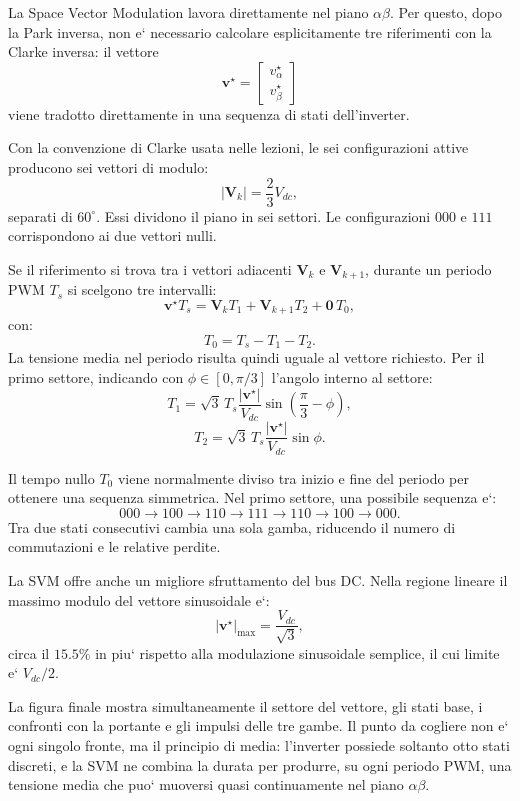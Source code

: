 \documentclass[11pt,a4paper]{article}
\begin{document}
La Space Vector Modulation lavora direttamente nel piano \(\alpha\beta\). Per questo, dopo la Park inversa, non e` necessario calcolare esplicitamente tre riferimenti con la Clarke inversa: il vettore
\[
\mathbf v^\star=
\begin{bmatrix}
v_\alpha^\star\\
v_\beta^\star
\end{bmatrix}
\]
viene tradotto direttamente in una sequenza di stati dell'inverter.

Con la convenzione di Clarke usata nelle lezioni, le sei configurazioni attive producono sei vettori di modulo:
\[
|\mathbf V_k|=\frac{2}{3}V_{dc},
\]
separati di \(60^\circ\). Essi dividono il piano in sei settori. Le configurazioni \(000\) e \(111\) corrispondono ai due vettori nulli.

Se il riferimento si trova tra i vettori adiacenti \(\mathbf V_k\) e \(\mathbf V_{k+1}\), durante un periodo PWM \(T_s\) si scelgono tre intervalli:
\[
\mathbf v^\star T_s
=\mathbf V_k T_1
+\mathbf V_{k+1}T_2
+\mathbf 0\,T_0,
\]
con:
\[
T_0=T_s-T_1-T_2.
\]
La tensione media nel periodo risulta quindi uguale al vettore richiesto. Per il primo settore, indicando con \(\phi\in[0,\pi/3]\) l'angolo interno al settore:
\[
T_1
=\sqrt{3}\,T_s\frac{|\mathbf v^\star|}{V_{dc}}
\sin\left(\frac{\pi}{3}-\phi\right),
\]
\[
T_2
=\sqrt{3}\,T_s\frac{|\mathbf v^\star|}{V_{dc}}
\sin\phi.
\]

Il tempo nullo \(T_0\) viene normalmente diviso tra inizio e fine del periodo per ottenere una sequenza simmetrica. Nel primo settore, una possibile sequenza e`:
\[
000\rightarrow100\rightarrow110\rightarrow111
\rightarrow110\rightarrow100\rightarrow000.
\]
Tra due stati consecutivi cambia una sola gamba, riducendo il numero di commutazioni e le relative perdite.

La SVM offre anche un migliore sfruttamento del bus DC. Nella regione lineare il massimo modulo del vettore sinusoidale e`:
\[
|\mathbf v^\star|_{\max}
=\frac{V_{dc}}{\sqrt{3}},
\]
circa il \(15.5\%\) in piu` rispetto alla modulazione sinusoidale semplice, il cui limite e` \(V_{dc}/2\).

La figura finale mostra simultaneamente il settore del vettore, gli stati base, i confronti con la portante e gli impulsi delle tre gambe. Il punto da cogliere non e` ogni singolo fronte, ma il principio di media: l'inverter possiede soltanto otto stati discreti, e la SVM ne combina la durata per produrre, su ogni periodo PWM, una tensione media che puo` muoversi quasi continuamente nel piano \(\alpha\beta\).
\end{document}
